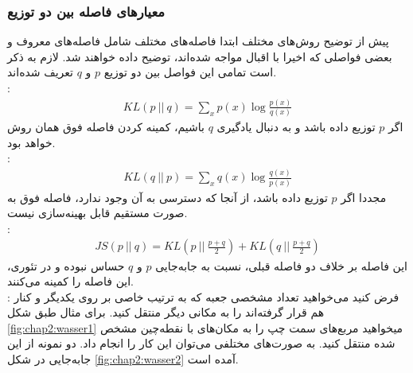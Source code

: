 \subsubsection{معیارهای فاصله بین دو توزیع} \label{chap2:divs}
پیش از توضیح روش‌های مختلف ابتدا فاصله‌های مختلف شامل فاصله‌های معروف و بعضی فواصلی که اخیرا با اقبال مواجه شده‌اند، توضیح داده خواهند شد. لازم به ذکر است تمامی این فواصل بین دو توزیع $p$ و $q$ تعریف شده‌اند.
\\
:
\begin{gather} \label{eq: kl}
	KL (p ~ || ~ q)   = \sum_x p(x) \log \frac{p(x)}{q(x)}
\end{gather}
اگر $p$ توزیع داده باشد و به دنبال یادگیری $q$ باشیم، کمینه کردن فاصله فوق همان روش \maxlikelihood{} خواهد بود.
\\
:
\begin{gather} \label{eq: rkl}
	KL (q ~ || ~ p)   = \sum_x q(x) \log \frac{q(x)}{p(x)}
\end{gather}
مجددا اگر $p$ توزیع داده باشد، از آنجا که دسترسی به آن وجود ندارد، فاصله فوق به صورت مستقیم قابل بهینه‌سازی نیست.
\\
:
\begin{gather} \label{eq: js}
	JS (p ~ || ~ q)   = KL(p ~ || ~ \frac{p + q}{2}) + KL(q ~ || ~ \frac{p + q}{2})
\end{gather}
این فاصله بر خلاف دو فاصله قبلی، نسبت به جابه‌جایی $p$ و $q$ حساس نبوده و \gan{} در تئوری، این فاصله را کمینه می‌کنند.
\\
:
فرض کنید می‌خواهید تعداد مشخصی جعبه که به ترتیب خاصی بر روی یکدیگر و کنار هم قرار گرفته‌اند را به مکانی دیگر منتقل کنید. برای مثال طبق شکل \ref{fig:chap2:wasser1} میخواهید مربع‌های سمت چپ را به مکان‌های با نقطه‌چین مشخص شده منتقل کنید. به صورت‌های مختلفی می‌توان این کار را انجام داد. دو نمونه از این جابه‌جایی در شکل \ref{fig:chap2:wasser2} آمده است.
